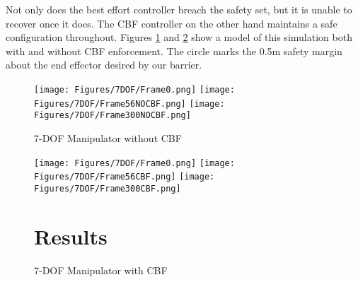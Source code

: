 \noindent Not only does the best effort controller breach the safety set, but it is unable to recover once it does. The CBF controller on the other hand maintains a safe configuration throughout. Figures \ref{fig:7dofnocbf2} and \ref{fig:7dofcbf2} show a model of this simulation both with and without CBF enforcement. The circle marks the 0.5m safety margin about the end effector desired by our barrier.

\begin{figure}[H]
    \centering
    \texttt{[image: Figures/7DOF/Frame0.png]}
    \texttt{[image: Figures/7DOF/Frame56NOCBF.png]}
    \texttt{[image: Figures/7DOF/Frame300NOCBF.png]}
    \caption{7-DOF Manipulator without CBF}
    \label{fig:7dofnocbf2}
\end{figure}

\begin{figure}[H]
    \centering
    \texttt{[image: Figures/7DOF/Frame0.png]}
    \texttt{[image: Figures/7DOF/Frame56CBF.png]}
    \texttt{[image: Figures/7DOF/Frame300CBF.png]}
    \caption{7-DOF Manipulator with CBF}
    \label{fig:7dofcbf2}
\section{Results}
\end{figure}